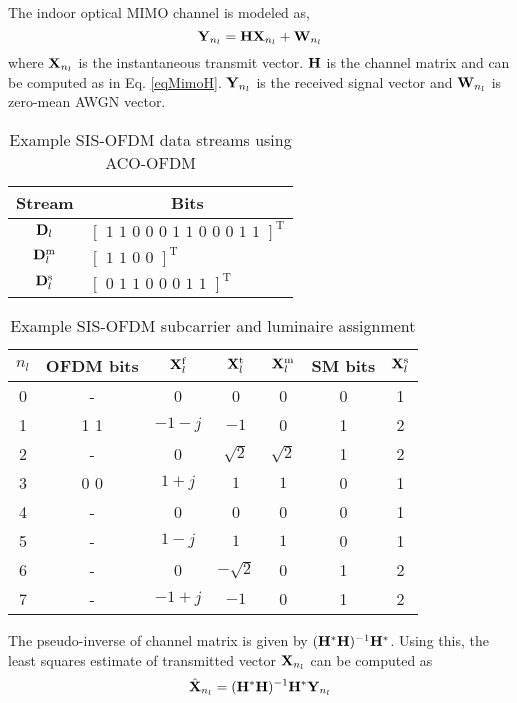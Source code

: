 The indoor optical MIMO channel is modeled as,
\begin{equation}
	\label{eqChannel}
	{\bf{Y}}_{n_l} = {\bf{H}}{\bf{X}}_{n_l} + {\bf{W}}_{n_l}
\end{equation}
where ${\bf{X}}_{n_l}$ is the instantaneous transmit vector. ${\bf{H}}$ is the channel matrix and can be computed as in Eq. \eqref{eqMimoH}. ${\bf{Y}}_{n_l}$ is the received signal vector and ${\bf{W}}_{n_l}$ is zero-mean AWGN vector.

\renewcommand{\arraystretch}{1.1}
\begin{table}[!t]
	\centering
		\begin{tabular}{|c|l|}
			\hline
			{\bf{Stream}}&\multicolumn{1}{|c|}{\bf{Bits}}\\
			\hline
			${\bf{D}}_l$ & $\left[\text{ 1 1 0 0 0 1 1 0 0 0 1 1 }\right]^{\text{T}} $\\
			\hline
			${\bf{D}}_l^{\text{m}}$ & $\left[\text{ 1 1 0 0 }\right]^{\text{T}} $\\
			\hline
			${\bf{D}}_l^{\text{s}}$ & $\left[\text{ 0 1 1 0 0 0 1 1 }\right]^{\text{T}} $\\
			\hline
		\end{tabular}
	\caption{Example SIS-OFDM data streams using ACO-OFDM}
	\label{tabExBits}
\end{table}
\begin{table}[!t]
	\centering
      \begin{tabular}{|c|c|c|c|c|c|c|}
			\hline
			{ $n_l$ }&{\bf{OFDM bits}}&${\bf{X}}_l^{\text{f}}$&${\bf{X}}^{\text{t}}_l$&${\bf{X}}^{\text{m}}_l$&{\bf{SM bits}}&${\bf{X}}^{\text{s}}_l$\\
			\hline
			0 & - & 0 & 0 & 0 &0 & 1\\
			\hline
			1 & 1 1 & $-1-j$ & $-1$ & 0 &1 & 2\\
			\hline
			2 & - & 0 & $\sqrt{2}$ & $\sqrt{2}$ &1 & 2\\
			\hline
			3 & 0 0 & $1+j$ & $1$ & $1$ & 0& 1\\
			\hline
			4 &-& 0 & 0 & 0 &0 & 1\\
			\hline
			5 &-& $1-j$ & $1$ & $1$ &0 & 1\\
			\hline
			6 &-& 0 & $-\sqrt{2}$ & 0 & 1& 2\\
			\hline
			7 &-& $-1+j$ & $-1$ & 0 &1 & 2\\
			\hline
		\end{tabular}
	\caption{Example SIS-OFDM subcarrier and luminaire assignment}
	\label{tabExample}
\end{table}
\renewcommand{\arraystretch}{1.0}
The pseudo-inverse of channel matrix is given by $({\bf{H}}^{*}{\bf{H}})^{-1}{\bf{H}}^{*}$. Using this, the least squares estimate of transmitted vector ${\bf{X}}_{n_l}$ can be computed as
\begin{equation}
	\label{eqXls}
	\hat{{\bf{X}}}_{n_l} = ({\bf{H}}^{*}{\bf{H}})^{-1}{\bf{H}}^{*}{\bf{Y}}_{n_l}
\end{equation}

